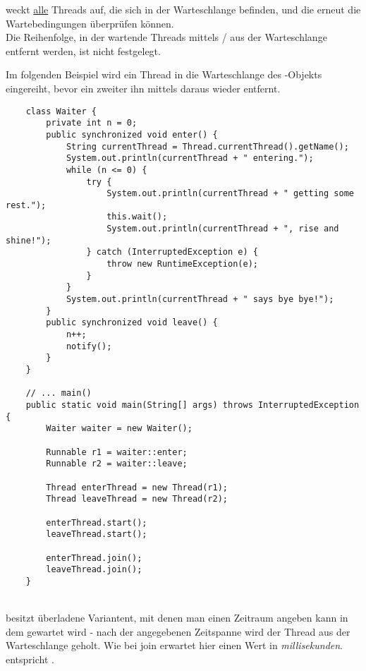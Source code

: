 \begin{center}
\end{center}
\noindent
weckt \ul{alle} Threads auf, die sich in der Warteschlange befinden, und die erneut die Wartebedingungen überprüfen können.\\
Die Reihenfolge, in der wartende Threads mittels / aus der Warteschlange entfernt werden, ist nicht festgelegt.

\newpage
\noindent
Im folgenden Beispiel wird ein Thread in die Warteschlange des -Objekts eingereiht, bevor ein zweiter ihn mittels  daraus wieder entfernt.
\begin{verbatim}
    class Waiter {
        private int n = 0;
        public synchronized void enter() {
            String currentThread = Thread.currentThread().getName();
            System.out.println(currentThread + " entering.");
            while (n <= 0) {
                try {
                    System.out.println(currentThread + " getting some rest.");
                    this.wait();
                    System.out.println(currentThread + ", rise and shine!");
                } catch (InterruptedException e) {
                    throw new RuntimeException(e);
                }
            }
            System.out.println(currentThread + " says bye bye!");
        }
        public synchronized void leave() {
            n++;
            notify();
        }
    }

    // ... main()
    public static void main(String[] args) throws InterruptedException {
        Waiter waiter = new Waiter();

        Runnable r1 = waiter::enter;
        Runnable r2 = waiter::leave;

        Thread enterThread = new Thread(r1);
        Thread leaveThread = new Thread(r2);

        enterThread.start();
        leaveThread.start();

        enterThread.join();
        leaveThread.join();
    }
\end{verbatim}\\

 besitzt überladene Variantent, mit denen man einen Zeitraum angeben kann in dem gewartet wird - nach der angegebenen Zeitspanne wird der Thread aus der Warteschlange geholt.
Wie bei join erwartet  hier einen Wert in \textit{millisekunden}.  entspricht .


